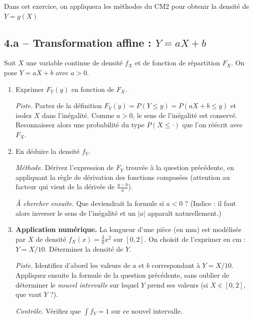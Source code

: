 Dans cet exercice, on appliquera les
méthodes du CM2 pour obtenir la densité
de $Y=g(X)$ 

\subsection*{4.a -- Transformation affine : $Y=aX+b$}

Soit $X$ une variable continue de densité $f_X$ et de fonction
de répartition $F_X$. On pose $Y=aX+b$ avec $a>0$.

\begin{enumerate}
  \item Exprimer $F_Y(y)$ en fonction de $F_X$.
  \begin{solution}
    \textit{Piste.} Partez de la définition
    $F_Y(y)=P(Y\le y)=P(aX+b\le y)$ et isolez $X$ dans l'inégalité.
    Comme $a>0$, le sens de l'inégalité est conservé. Reconnaissez
    alors une probabilité du type $P(X\le \cdot)$ que l'on réécrit
    avec $F_X$.
  \end{solution}

  \item En déduire la densité $f_Y$.
  \begin{solution}
    \textit{Méthode.} Dérivez l'expression de $F_Y$ trouvée
    à la question précédente, en appliquant la règle de dérivation
    des fonctions composées (attention au facteur qui vient
    de la dérivée de $\tfrac{y-b}{a}$).

    \textit{À chercher ensuite.} Que deviendrait la formule
    si $a<0$ ? (Indice : il faut alors inverser le sens de
    l'inégalité et un $|a|$ apparaît naturellement.)
  \end{solution}

  \item \textbf{Application numérique.}
  La longueur d'une pièce (en mm) est modélisée par $X$ de densité
  $f_X(x)=\tfrac{3}{8}x^2$ sur $[0,2]$. On choisit de l'exprimer en cm :
  $Y=X/10$. Déterminer la densité de $Y$.
  \begin{solution}
    \textit{Piste.} Identifiez d'abord les valeurs de $a$ et $b$
    correspondant à $Y=X/10$. Appliquez ensuite la formule de la
    question précédente, sans oublier de déterminer le \emph{nouvel
    intervalle} sur lequel $Y$ prend ses valeurs (si $X\in[0,2]$,
    que vaut $Y$ ?).

    \textit{Contrôle.} Vérifiez que $\int f_Y=1$ sur ce nouvel
    intervalle.
  \end{solution}
\end{enumerate}

